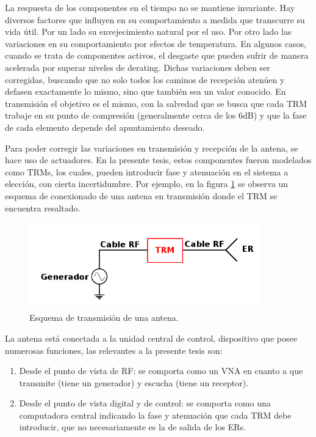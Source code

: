 La respuesta de los componentes en el tiempo no se mantiene invariante. Hay diversos factores que influyen en su comportamiento a
medida que transcurre su vida útil. Por un lado su envejecimiento natural por el uso. Por otro lado las variaciones en su 
comportamiento por efectos de temperatura. En algunos casos, cuando se trata de componentes activos, el desgaste que pueden
sufrir de manera acelerada por superar niveles de derating. Dichas variaciones deben ser corregidas, buscando que no solo todos
los caminos de recepción atenúen y defasen exactamente lo mismo, sino que también sea un valor conocido. En transmisión el
objetivo es el mismo, con la salvedad que se busca que cada TRM trabaje en su punto de compresión (generalmente cerca de los
6dB) y que la fase de cada elemento depende del apuntamiento deseado.

Para poder corregir las variaciones en transmisión y recepción de la antena, se hace uso de actuadores. En la presente tesis,
estos componentes fueron modelados como TRMs, los cuales, pueden introducir fase y atenuación en el sistema a elección, con
cierta incertidumbre. Por ejemplo, en la figura \ref{fig:antennaTRM} se observa un esquema 
de conexionado de una antena en transmisión donde el TRM se encuentra resaltado.

\begin{figure}[H]
 \centering
 \includegraphics[width=10cm]{gfx/antennaTRM.png}
 \caption{Esquema de transmisión de una antena.}
 \label{fig:antennaTRM}
\end{figure}

La antena está conectada a la unidad central de control, dispositivo que posee numerosas funciones, las relevantes a la presente tesis 
son:
\begin{enumerate}
	\item Desde el punto de vista de RF: se comporta como un VNA en cuanto a que transmite (tiene un generador) y escucha (tiene un
		receptor).
	\item Desde el punto de vista digital y de control: se comporta como una computadora central indicando la fase y atenuación que
		cada TRM debe introducir, que no necesariamente es la de salida de los ERs.
\end{enumerate}

